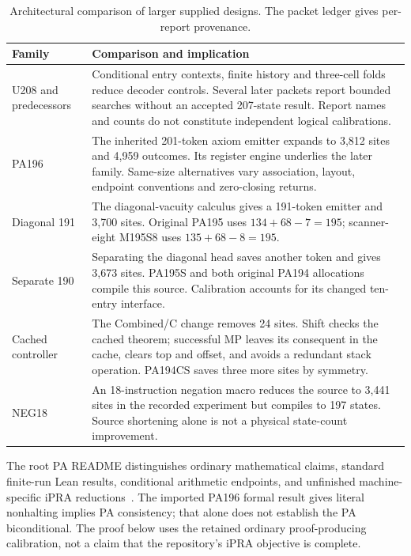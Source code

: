 \documentclass[11pt,letterpaper]{article}
\begin{document}
\begin{table}[ht]
\centering\small
\begin{tabularx}{\linewidth}{@{}lX@{}}
\toprule
Family & Comparison and implication\\
\midrule
U208 and predecessors &
Conditional entry contexts, finite history and three-cell folds
reduce decoder controls. Several later packets report bounded searches
without an accepted 207-state result. Report names and counts do not
constitute independent logical calibrations.\\
PA196 &
The inherited 201-token axiom emitter expands to 3,812 sites and 4,959
outcomes. Its register engine underlies the later family. Same-size
alternatives vary association, layout, endpoint conventions and
zero-closing returns.\\
Diagonal 191 &
The diagonal-vacuity calculus gives a 191-token emitter and 3,700 sites.
Original PA195 uses $134+68-7=195$; scanner-eight M195S8 uses
$135+68-8=195$.\\
Separate 190 &
Separating the diagonal head saves another token and gives 3,673 sites.
PA195S and both original PA194 allocations compile this source.
Calibration accounts for its changed ten-entry interface.\\
Cached controller &
The Combined/C change removes 24 sites. Shift checks the cached
theorem; successful MP leaves its consequent in the cache, clears top
and offset, and avoids a redundant stack operation. PA194CS saves
three more sites by symmetry.\\
NEG18 &
An 18-instruction negation macro reduces the source to 3,441 sites in
the recorded experiment but compiles to 197 states. Source shortening
alone is not a physical state-count improvement.\\
\bottomrule
\end{tabularx}
\caption{Architectural comparison of larger supplied designs. The
packet ledger gives per-report provenance.}
\end{table}

The root PA README distinguishes ordinary mathematical claims,
standard finite-run Lean results, conditional arithmetic endpoints,
and unfinished machine-specific iPRA reductions~\cite{repo}.
The imported PA196 formal result gives literal nonhalting implies
PA consistency; that alone does not establish the PA biconditional.
The proof below uses the retained ordinary proof-producing calibration,
not a claim that the repository's iPRA objective is complete.
\end{document}
